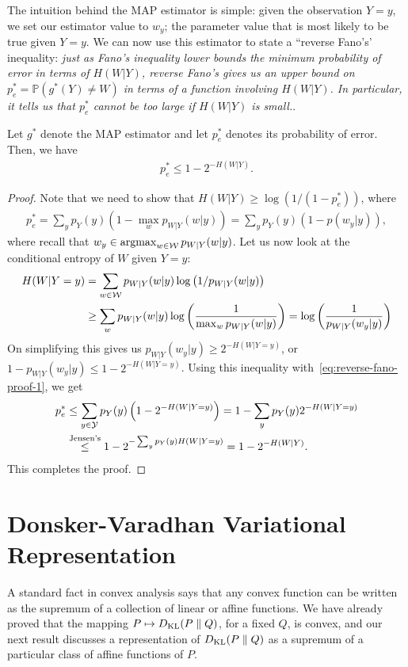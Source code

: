 \documentclass[12pt]{article}
\begin{document}
The intuition behind the MAP estimator is simple: given the observation $Y=y$, we set our estimator value to $w_y$; the parameter value that is most likely to be true given $Y=y$. We can now use this estimator to state a ``reverse Fano's' inequality: \emph{just as Fano's inequality lower bounds the minimum probability of error in terms of $H(W|Y)$, reverse Fano's gives us an upper bound on $p_e^* = \mathbb{P}(g^*(Y) \neq W)$ in terms of a function involving $H(W|Y)$. In particular, it tells us that $p_e^*$ cannot be too large if $H(W|Y)$ is small.}. 

\begin{proposition}
\label{prop:reverse-Fano}
Let $g^*$ denote the MAP estimator and let $p_e^*$ denotes its probability of error. Then, we have 
\begin{align}
p_e^* \leq 1 - 2^{-H(W|Y)}. 
\end{align}
\end{proposition}
%
\begin{proof}
Note that we need to show that $H(W|Y) \geq \log(1/(1-p^*_e))$, where 
\begin{align}
p^*_e = \sum_y p_Y(y) (1 - \max_w p_{W|Y}(w|y)) = \sum_{y} p_Y(y) (1 -  p(w_y|y)), \label{eq:reverse-fano-proof-1}
\end{align}
where recall that $w_y \in \operatorname*{argmax}_{w \in {\cal W}} p_{W|Y}(w|y)$. 
Let us now look at the conditional entropy of $W$ given $Y=y$: 
\begin{align}
H(W|Y=y) &=  \sum_{w \in {\cal W}} p_{W|Y}(w|y) \log \left(1/p_{W|Y}(w|y) \right) \\
& \geq \sum_{w} p_{W|Y}(w|y) \log \left( \frac{1}{\max_{w} p_{W|Y}(w|y)} \right)  = \log\left( \frac{1}{p_{W|Y}(w_y|y)} \right)
\end{align}
On simplifying this gives us $p_{W|Y}(w_y|y) \geq 2^{-H(W|Y=y)}$, or $1 - p_{W|Y}(w_y|y) \leq 1 - 2^{-H(W|Y=y)}$. Using this inequality with~\eqref{eq:reverse-fano-proof-1}, we get 
\begin{align}
p_e^* &\leq \sum_{y \in {\cal Y}} p_Y(y) \left( 1 - 2^{-H(W|Y=y)} \right)   = 1 - \sum_{y} p_Y(y) 2^{- H(W|Y=y)} \\
& \stackrel{\text{Jensen's}}{\leq} 1 - 2^{- \sum_y p_Y(y) H(W|Y=y)} = 1 - 2^{-H(W|Y)}. 
\end{align} 
This completes the proof. 
\end{proof}


\section{Donsker-Varadhan Variational Representation}
A standard fact in convex analysis says that any convex function can be written as the supremum of a collection of linear or affine functions. We have already proved that the mapping $P \mapsto D_{\text{KL}}(P\parallel Q)$, for a fixed $Q$, is convex, and our next result discusses a representation of $D_{\text{KL}}(P \parallel Q)$ as a supremum of a particular class of affine functions of $P$. 
\end{document}
